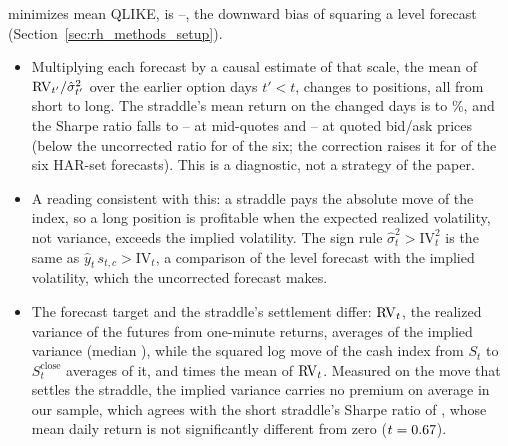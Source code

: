 \begin{itemize}
  minimizes mean QLIKE, is \rhedCalScaleMin--\rhedCalScaleMax, the downward bias of squaring a level forecast
  (Section~\ref{sec:rh_methods_setup}).
  \begin{itemize}
  \item Multiplying each forecast by a causal estimate of that scale, the mean of $\mathrm{RV}_{t'}/\hat\sigma^2_{t'}$ over the
    earlier option days $t' < t$, changes \rhedBcFlipMin{} to \rhedBcFlipMax{} positions, all from short to long.
    The straddle's mean return on the changed days is \rhedBcFlipRMin{} to \rhedBcFlipRMax\%, and the Sharpe ratio
    falls to \rhedBcShMin--\rhedBcShMax{} at mid-quotes and \rhedBcShXMin--\rhedBcShXMax{} at quoted bid/ask prices
    (below the uncorrected ratio for \rhedBcShDownN{} of the six; the correction raises it for \rhedHarBcShUpN{} of
    the six HAR-set forecasts). This is a diagnostic, not a strategy of the paper.
  \item A reading consistent with this: a straddle pays the absolute move of the index, so a long position is
    profitable when the expected realized volatility, not variance, exceeds the implied volatility. The sign rule
    $\hat\sigma^2_t > \mathrm{IV}_t^2$ is the same as $\hat y_t\, s_{t,c} > \mathrm{IV}_t$, a comparison of the level
    forecast with the implied volatility, which the uncorrected forecast makes.
  \item The forecast target and the straddle's settlement differ: $\mathrm{RV}_t$, the realized variance of the futures from
    one-minute returns, averages \rhedUncRVIVMean{} of the implied variance (median \rhedUncRVIVMed), while the squared
    log move of the cash index from $S_t$ to $S^{\mathrm{close}}_t$ averages \rhedMoveSqIV{} of it, and
    \rhedMoveSqRV{} times the mean of $\mathrm{RV}_t$. Measured on the move that settles the straddle, the implied variance
    carries no premium on average in our sample, which agrees with the short straddle's Sharpe ratio of
    \rheShortSh, whose mean daily return is not significantly different from zero ($t = 0.67$).
  \end{itemize}

\end{itemize}
